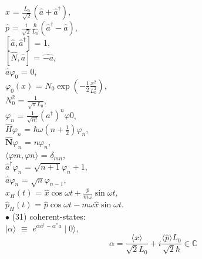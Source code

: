 \documentclass[a4paper, 10pt, onepage]{elegantbook}
\begin{document}
{$\hat{x}$ = $\frac{L_0}{\sqrt{2}}(\hat{a} + \hat{a}^\dagger)$,  \\

$\hat{p}$ = $\frac{i}{\sqrt{2}} \frac{\hbar}{L_0}(\hat{a}^\dagger - \hat{a})$,  \\

$[\hat{a}, \hat{a}^\dagger]$ = 1,  \\

$[\hat{N}, \hat{a}]$ = $\hat{-a}$,  \\

$\hat{a} \varphi_0$ = 0, \\

$\varphi_0(x)$ = $N_0 \exp(- \frac{1}{2} \frac{x^2}{L^2_0})$, \\

$N^2_0$ = $\frac{1}{\sqrt{\pi}L_0}$,  \\

$\varphi_n$ = $\frac{1}{\sqrt{n!}} (a^\dagger)^n \varphi0 $, \\

$\hat{H} \varphi_n$ = $ \hbar \omega( n + \frac{1}{2}) \varphi_n$, \\

$ \hat{\mathbf N} \varphi_n$ = $n \varphi_n$,  \\

$\langle \varphi{m}, \varphi{n} \rangle$ = $\delta_{mn}$, \\ 

$\hat{a}^\dagger \varphi_n$ = $\sqrt{n + 1} \varphi_n + 1$,  \\

$\hat{a} \varphi_n$ = $\sqrt{n} \varphi_{n - 1}$, \\

$\hat{x}_H(t)$ = $\hat{x} \cos \omega{t} + \frac{\hat{p}}{m \omega} \sin{\omega{t}}$,  \\  

$\hat{p}_H(t)$ = $\hat{p} \cos \omega{t} - m \omega \hat{x} \sin \omega{t}$.  \\

$\bullet$ (31) coherent-states:\\

$\mid \alpha \rangle$ $\equiv$ $e^{\alpha{a}^\dagger - \alpha^*{a}} \mid 0 \rangle$,  \\

\begin{equation}
\alpha = \frac{\langle \hat{x} \rangle} {\sqrt2{L_0}} + i \frac{\langle \hat{p} \rangle L_0} {\sqrt2 \hbar} \in \mathbb{C}
\end{equation}

}
\end{document}
